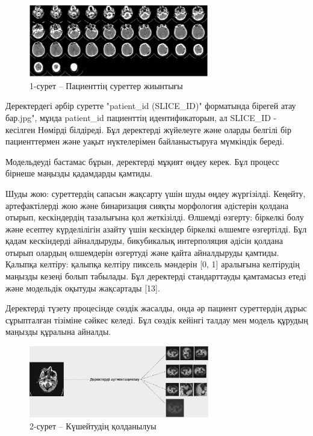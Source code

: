\begin{figure}[H]
	\centering
	\includegraphics[width=0.7\textwidth]{assets/1}
	\caption*{1-сурет -- Пациенттің суреттер жиынтығы}
\end{figure}

\begin{multicols}{2}
Деректердегі әрбір суретте "patient\_id (SLICE\_ID)" форматында бірегей
атау бар.jpg", мұнда patient\_id пациенттің идентификаторын, ал
SLICE\_ID - кесілген Нөмірді білдіреді. Бұл деректерді жүйелеуге және
оларды белгілі бір пациенттермен және уақыт нүктелерімен байланыстыруға
мүмкіндік береді.

Модельдеуді бастамас бұрын, деректерді мұқият өңдеу керек. Бұл процесс
бірнеше маңызды қадамдарды қамтиды.

Шуды жою: суреттердің сапасын жақсарту үшін шуды өңдеу жүргізілді.
Кеңейту, артефактілерді жою және бинаризация сияқты морфология әдістерін
қолдана отырып, кескіндердің тазалығына қол жеткізілді. Өлшемді өзгерту:
біркелкі болу және есептеу күрделілігін азайту үшін кескіндер біркелкі
өлшемге өзгертілді. Бұл қадам кескіндерді айналдыруды, бикубикалық
интерполяция әдісін қолдана отырып олардың өлшемдерін өзгертуді және
қайта айналдыруды қамтиды. Қалыпқа келтіру: қалыпқа келтіру пиксель
мәндерін {[}0, 1{]} аралығына келтірудің маңызды кезеңі болып табылады.
Бұл деректерді стандарттауды қамтамасыз етеді және модельдік оқытуды
жақсартады {[}13{]}.

Деректерді түзету процесінде сөздік жасалды, онда әр пациент суреттердің
дұрыс сұрыпталған тізіміне сәйкес келеді. Бұл сөздік кейінгі талдау мен
модель құрудың маңызды құралына айналды.
\end{multicols}

\begin{figure}[H]
	\centering
	\includegraphics[width=0.7\textwidth]{assets/2}
	\caption*{2-сурет -- Күшейтудің қолданылуы}
\end{figure}

